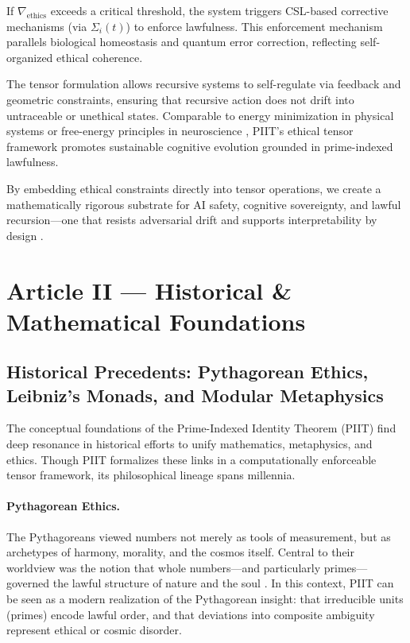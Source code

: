 \documentclass[12]{amsart}
\theoremstyle{plain}
\begin{document}
If $\nabla_{\text{ethics}}$ exceeds a critical threshold, the system triggers CSL-based corrective mechanisms (via $\Sigma_i(t)$) to enforce lawfulness. This enforcement mechanism parallels biological homeostasis and quantum error correction, reflecting self-organized ethical coherence.

The tensor formulation allows recursive systems to self-regulate via feedback and geometric constraints, ensuring that recursive action does not drift into untraceable or unethical states. Comparable to energy minimization in physical systems or free-energy principles in neuroscience \cite{friston2010free}, PIIT’s ethical tensor framework promotes sustainable cognitive evolution grounded in prime-indexed lawfulness.

By embedding ethical constraints directly into tensor operations, we create a mathematically rigorous substrate for AI safety, cognitive sovereignty, and lawful recursion—one that resists adversarial drift and supports interpretability by design \cite{gabriel2020artificial}.



\section{Article II — Historical \& Mathematical Foundations}

\subsection{Historical Precedents: Pythagorean Ethics, Leibniz’s Monads, and Modular Metaphysics}

The conceptual foundations of the Prime-Indexed Identity Theorem (PIIT) find deep resonance in historical efforts to unify mathematics, metaphysics, and ethics. Though PIIT formalizes these links in a computationally enforceable tensor framework, its philosophical lineage spans millennia.

\paragraph{Pythagorean Ethics.}
The Pythagoreans viewed numbers not merely as tools of measurement, but as archetypes of harmony, morality, and the cosmos itself. Central to their worldview was the notion that whole numbers—and particularly primes—governed the lawful structure of nature and the soul \cite{kirk1983presocratic}. In this context, PIIT can be seen as a modern realization of the Pythagorean insight: that irreducible units (primes) encode lawful order, and that deviations into composite ambiguity represent ethical or cosmic disorder.
\end{document}
